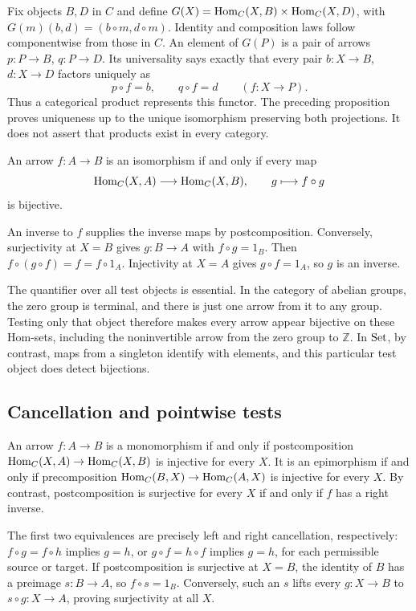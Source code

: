 \begin{example}
Fix objects $B,D$ in $C$ and define
$G(X)={\textrm{Hom}}_C(X,B)\times{\textrm{Hom}}_C(X,D)$, with
$G(m)(b,d)=(b\circ m,d\circ m)$. Identity and composition laws follow
componentwise from those in $C$. An element of $G(P)$ is a pair of arrows
$p:P\to B$, $q:P\to D$. Its universality says exactly that every pair
$b:X\to B$, $d:X\to D$ factors uniquely as
\[
p\circ f=b,\qquad q\circ f=d\qquad(f:X\to P).
\]
Thus a categorical product represents this functor. The preceding
proposition proves uniqueness up to the unique isomorphism preserving
both projections. It does not assert that products exist in every category.
\end{example}

\begin{proposition}
An arrow $f:A\to B$ is an isomorphism if and only if every map
\[
{\textrm{Hom}}_C(X,A)\longrightarrow{\textrm{Hom}}_C(X,B),\qquad g\longmapsto f\circ g
\]
is bijective.
\end{proposition}
\Proof
An inverse to $f$ supplies the inverse maps by postcomposition.
Conversely, surjectivity at $X=B$ gives $g:B\to A$ with $f\circ g=1_B$.
Then $f\circ(g\circ f)=f=f\circ1_A$. Injectivity at $X=A$ gives
$g\circ f=1_A$, so $g$ is an inverse.
\Done

The quantifier over all test objects is essential. In the category of
abelian groups, the zero group is terminal, and there is just one arrow
from it to any group. Testing only that object therefore makes every
arrow appear bijective on these Hom-sets, including the noninvertible
arrow from the zero group to $\mathbb Z$. In ${\textrm{Set}}$, by contrast,
maps from a singleton identify with elements, and this particular test
object does detect bijections.


\subsection{Cancellation and pointwise tests}
\begin{proposition}
An arrow $f:A\to B$ is a monomorphism if and only if postcomposition
${\textrm{Hom}}_C(X,A)\to{\textrm{Hom}}_C(X,B)$ is injective for every $X$.
It is an epimorphism if and only if precomposition
${\textrm{Hom}}_C(B,X)\to{\textrm{Hom}}_C(A,X)$ is injective for every $X$.
By contrast, postcomposition is surjective for every $X$ if and only
if $f$ has a right inverse.
\end{proposition}
\Proof
The first two equivalences are precisely left and right cancellation,
respectively: $f\circ g=f\circ h$ implies $g=h$, or
$g\circ f=h\circ f$ implies $g=h$, for each permissible source or
target. If postcomposition is surjective at $X=B$, the identity of $B$
has a preimage $s:B\to A$, so $f\circ s=1_B$. Conversely, such an
$s$ lifts every $g:X\to B$ to $s\circ g:X\to A$, proving surjectivity
at all $X$.
\Done

